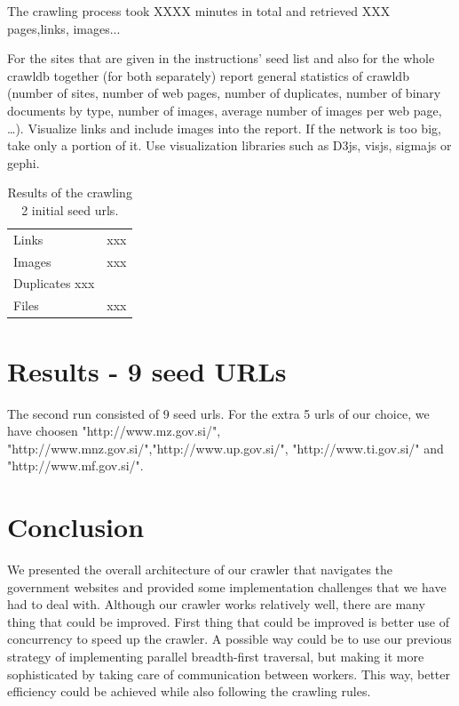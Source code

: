 \documentclass[9pt]{IEEEtran}
\begin{document}
The crawling process took XXXX minutes in total and retrieved XXX pages,links, images...

For the sites that are given in the instructions’ seed list and also for the whole crawldb together (for both separately) report general statistics of crawldb (number of sites, number of web pages, number of duplicates, number of binary documents by type, number of images, average number of images per web page, …). Visualize links and include images into the report. If the network is too big, take only a portion of it. Use visualization libraries such as D3js, visjs, sigmajs or gephi.


\begin{table}[H]
    \begin{center}
    \caption{Results of the crawling 2 initial seed urls.}
        \begin{tabular}{ l | r }
        
        Links & xxx \\
        Images & xxx \\
        Duplicates xxx \\
        Files & xxx \\
        \end{tabular}
    \label{tab:results2}
    \end{center}
\end{table}

\section{Results - 9 seed URLs}
The second run consisted of 9 seed urls. For the extra 5 urls of our choice, we have choosen "http://www.mz.gov.si/", "http://www.mnz.gov.si/","http://www.up.gov.si/", "http://www.ti.gov.si/" and "http://www.mf.gov.si/". 

\section{Conclusion}
We presented the overall architecture of our crawler that navigates the government websites and provided some implementation challenges that we have had to deal with.
Although our crawler works relatively well, there are many thing that could be improved.
First thing that could be improved is better use of concurrency to speed up the crawler.
A possible way could be to use our previous strategy of implementing parallel breadth-first traversal, but making it more sophisticated by taking care of communication between workers.
This way, better efficiency could be achieved while also following the crawling rules.
\end{document}

